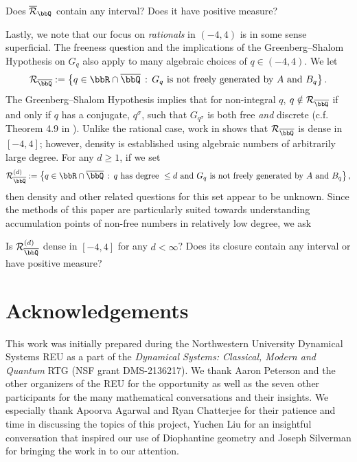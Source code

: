 \documentclass[11 pt]{amsart}
\begin{document}
\begin{question}
    Does $\overline{\mathcal{R}}_\bbQ$ contain any interval? Does it have positive measure?
\end{question}

Lastly, we note that our focus on \textit{rationals} in $(-4,4)$ is in some sense superficial. The freeness question and the implications of the Greenberg--Shalom Hypothesis on $G_q$ also apply to many algebraic choices of $q\in(-4,4)$. We let
\[
\mathcal{R}_{\overline{\bbQ}}:=\left\{q\in\bbR\cap\overline{\bbQ}\,:\,G_q\textrm{ is not freely generated by }A\textrm{ and }B_q\right\}.
\]
The Greenberg--Shalom Hypothesis implies that for non-integral $q$, $q\notin\mathcal{R}_{\overline{\bbQ}}$ if and only if $q$ has a conjugate, $q^\sigma$, such that $G_{q^\sigma}$ is both free \textit{and} discrete (c.f. Theorem 4.9 in \cite{brody-fisher-mj-limbeek-2023}). Unlike the rational case, work in \cite{cjr} shows that $\mathcal{R}_{\overline{\bbQ}}$ is dense in $[-4,4]$; however, density is established using algebraic numbers of arbitrarily large degree. For any $d\geq 1$, if we set
\[
\mathcal{R}_{\overline{\bbQ}}^{(d)}:=\left\{q\in\bbR\cap\overline{\bbQ}\,:\,q\textrm{ has degree }\leq d\textrm{ and }G_q\textrm{ is not freely generated by }A\textrm{ and }B_q\right\},
\]
then density and other related questions for this set appear to be unknown. Since the methods of this paper are particularly suited towards understanding accumulation points of non-free numbers in relatively low degree, we ask 

\begin{question}
\label{question:algebraic}
    Is $\mathcal{R}_{\overline{\bbQ}}^{(d)}$ dense in $[-4,4]$ for any $d<\infty$? Does its closure contain any interval or have positive measure?
\end{question}

\section*{Acknowledgements}
This work was initially prepared during the Northwestern University Dynamical Systems REU as a part of the \textit{Dynamical Systems: Classical, Modern and Quantum} RTG (NSF grant DMS-2136217). We thank Aaron Peterson and the other organizers of the REU for the opportunity as well as the seven other participants for the many mathematical conversations and their insights. We especially thank Apoorva Agarwal and Ryan Chatterjee for their patience and time in discussing the topics of this project, Yuchen Liu for an insightful conversation that inspired our use of Diophantine geometry and Joseph Silverman for bringing the work in \cite{poulakis-2003} to our attention.
\end{document}
